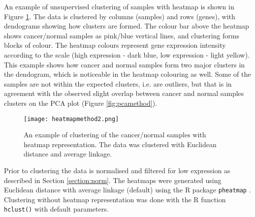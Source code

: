     

   An example of unsupervised clustering of samples with heatmap is shown in Figure \ref{fig:heatmapmethod}. The data is clustered by columns (samples) and rows (genes), with dendograms showing how clusters are formed. The colour bar above the heatmap shows cancer/normal samples as pink/blue vertical lines, and clustering forms blocks of colour. The heatmap colours  represent gene expression intensity according to the scale (high expression - dark blue, low expression - light yellow). 
   This example shows how cancer and normal samples form two major clusters in the dendogram, which is noticeable in the heatmap colouring as well. Some of the samples are not within the expected clusters, i.e. are outliers, but that is in agreement with the observed  slight overlap between cancer and normal samples clusters on the PCA plot (Figure \ref{fig:pcamethod}).

        \begin{figure}[h]
        \centering
        \texttt{[image: heatmapmethod2.png]}
        \caption[Clustering with heatmap example]{An example of clustering of the cancer/normal samples with heatmap representation. The data was clustered with Euclidean distance and average linkage. }
        \label{fig:heatmapmethod}
        \end{figure}
    
    Prior to clustering the data is normalised and filtered for low expression as described in Section \ref{section:norm}. The heatmaps were generated using Euclidean distance with average linkage (default) using the R package  \texttt{pheatmap} \cite{kolde2012pheatmap}. Clustering without heatmap representation was done with the R function \texttt{hclust()} with default parameters.


   \cite{}



 
